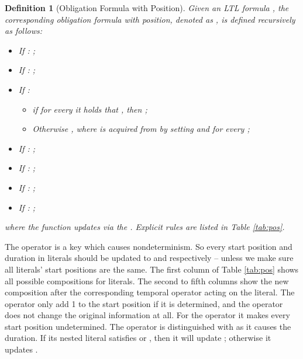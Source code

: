 \documentclass[conference]{IEEEtran}
\newtheorem{definition}{Definition}
\begin{document}
\begin{definition}[Obligation Formula with Position]\label{def:ofp}
    Given an LTL formula , the corresponding \textit{obligation formula with position}, denoted 
    as , is defined recursively as follows:
    \begin{itemize}
      \item If : ;
      \item If : ;
      \item If : 
      \begin{itemize}
        \item if for every 
       it holds that , then 
      ; 
    \item Otherwise ,
      where  is acquired from  by setting
       and  for every ;
      \end{itemize}
      \item If : ; 
      \item If : ;
      \item If  : ;       
      \item If : ;
    \end{itemize}
    where the function  updates 
    via the .  Explicit rules are listed in
    Table \ref{tab:pos}.
  
\begin{table}
\caption{The explicit rules for the  function}\label{tab:pos}
\centering
{}
    
\end{table}
\end{definition}

The  operator is a key which causes nondeterminism. So every start position and duration in 
literals should be updated to  and  respectively -- unless we make sure all literals' start 
positions are the same.
The first column of Table \ref{tab:pos} shows all possible compositions for literals. The second to 
fifth columns show the new composition after the corresponding temporal operator acting on the 
literal. The  operator only add 1 to the start position if it is determined, and the  operator 
does not change the original information at all. For the  operator it makes every start 
position undetermined. The  operator is distinguished with  as it causes the duration. If its 
nested literal  satisfies  or , then it will update 
; otherwise it updates .
\end{document}
